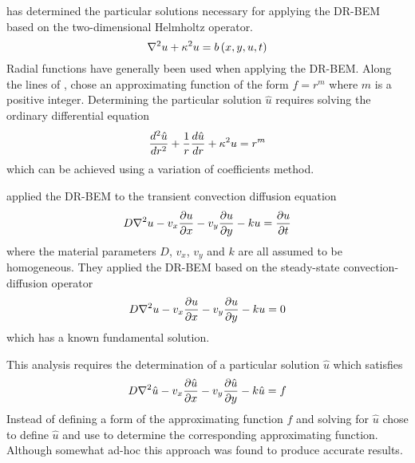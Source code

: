 \citet{zhu:1993} has determined the particular solutions necessary for
applying the DR-BEM based on the two-dimensional Helmholtz operator.
\begin{equation}
  \laplacian{}{u} + \kappa^2 u = \fnof{b}{x,y,u,t}
\end{equation}
Radial functions have generally been used when applying the DR-BEM.  Along
the lines of \citet{wrobel:1986}, \citet{zhu:1993} chose an
approximating function of the form $f = r^{m}$ where $m$ is a positive
integer.  Determining the particular solution $\hat{u}$ requires solving the
ordinary differential equation
\begin{equation}
   \dfrac{ d^{2} \hat{u}}{d {r}^{2}}  + \dfrac{1}{r}  \dfrac{ d \hat{u}}{d r}  + \kappa^2 u = r^{m}
\end{equation}
which can be achieved using a variation of coefficients method.

\citet{partridge:1992} applied the DR-BEM to the transient convection
diffusion equation
\begin{equation}
  D \laplacian{}{u} - v_{x} \delby{u}{x} - v_{y} \delby{u}{y} - k u = \delby{u}{t}
\end{equation}
where the material parameters $D$, $v_{x}$, $v_{y}$ and $k$ are all assumed to
be homogeneous.  They applied the DR-BEM based on the steady-state
convection-diffusion operator
\begin{equation}
  D \laplacian{}{u} - v_{x} \delby{u}{x} - v_{y} \delby{u}{y} - k u = 0
\label{eq:steadycd}
\end{equation}
which has a known fundamental solution.

This analysis requires the determination of a particular solution $\hat{u}$
which satisfies
\begin{equation}
  D \laplacian{}{\hat{u}} - v_{x} \delby{\hat{u}}{x} - v_{y} \delby{\hat{u}}{y}
  - k \hat{u} = f
\label{eq:cdpartic}
\end{equation}
Instead of defining a form of the approximating function $f$ and solving
for $\hat{u}$ \citet{partridge:1992} chose to define $\hat{u}$ and use
 to determine the corresponding approximating function.
Although somewhat ad-hoc this approach was found to produce accurate
results.

